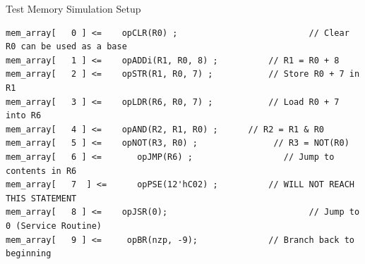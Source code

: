 \documentclass[journal, twocolumn, final,11pt,letterpaper]{IEEEtran}
\begin{document}
Test Memory Simulation Setup
\begin{lstlisting}
mem_array[   0 ] <=    opCLR(R0) ;							// Clear R0 can be used as a base
mem_array[   1 ] <=    opADDi(R1, R0, 8) ;			// R1 = R0 + 8
mem_array[   2 ] <=    opSTR(R1, R0, 7) ;			// Store R0 + 7 in R1
mem_array[   3 ] <=    opLDR(R6, R0, 7) ; 			// Load R0 + 7 into R6
mem_array[   4 ] <=    opAND(R2, R1, R0) ;		// R2 = R1 & R0
mem_array[   5 ] <=    opNOT(R3, R0) ;	             // R3 = NOT(R0)
mem_array[	 6 ] <= 	  opJMP(R6) ;                  // Jump to contents in R6
mem_array[	 7	] <= 	  opPSE(12'hC02) ;			// WILL NOT REACH THIS STATEMENT
mem_array[   8 ] <=    opJSR(0);							// Jump to 0 (Service Routine)
mem_array[	 9 ] <= 	opBR(nzp, -9); 				// Branch back to beginning

\end{lstlisting}


\end{document}
